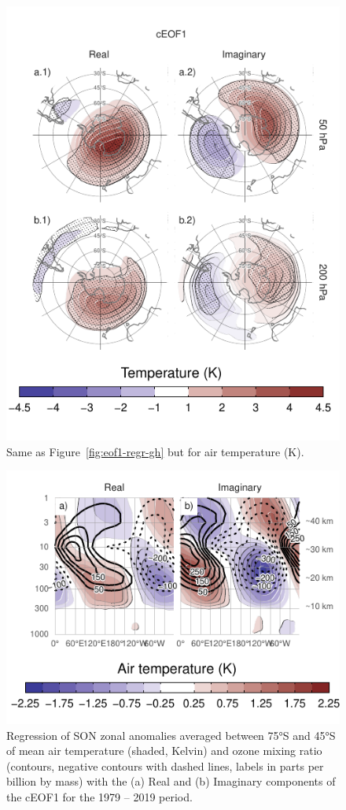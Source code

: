 \documentclass[smallextended]{svjour3}       %
\begin{document}
\begin{figure}
\centering
\includegraphics{../figures/eof1-regr-t-1.pdf}
\caption{\label{fig:eof1-regr-t}Same as Figure~\ref{fig:eof1-regr-gh} but for air temperature (K).}
\end{figure}



\begin{figure}
\centering
\includegraphics{../figures/t-vertical-1.pdf}
\caption{\label{fig:t-vertical}Regression of SON zonal anomalies averaged between 75°S and 45°S of mean air temperature (shaded, Kelvin) and ozone mixing ratio (contours, negative contours with dashed lines, labels in parts per billion by mass) with the (a) Real and (b) Imaginary components of the cEOF1 for the 1979 -- 2019 period.}
\end{figure}
\end{document}
